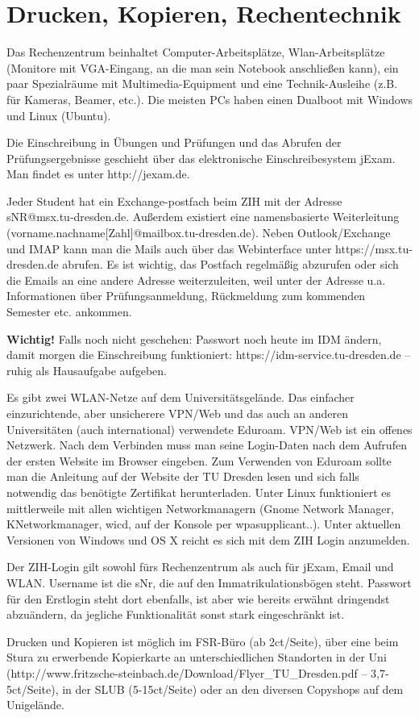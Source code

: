\documentclass[a4paper,12pt]{report}
\begin{document}
\section{Drucken, Kopieren, Rechentechnik}
\begin{itemize*}
	\item Das Rechenzentrum beinhaltet Computer-Arbeitsplätze, Wlan-Arbeitsplätze (Monitore mit VGA-Eingang, an die man sein Notebook anschließen kann), ein paar Spezialräume mit Multimedia-Equipment und eine Technik-Ausleihe (z.B. für Kameras, Beamer, etc.).
	Die meisten PCs haben einen Dualboot mit Windows und Linux (Ubuntu).
	\item Die Einschreibung in Übungen und Prüfungen und das Abrufen der Prüfungsergebnisse geschieht über das elektronische Einschreibesystem jExam.
	Man findet es unter http://jexam.de.
	\item Jeder Student hat ein Exchange-postfach beim ZIH mit der Adresse sNR@msx.tu-dresden.de. Außerdem existiert eine namensbasierte Weiterleitung (vorname.nachname[Zahl]@mailbox.tu-dresden.de).
	Neben Outlook/Exchange und IMAP kann man die Mails auch über das Webinterface unter https://msx.tu-dresden.de abrufen.
	Es ist wichtig, das Postfach regelmäßig abzurufen oder sich die Emails an eine andere Adresse weiterzuleiten, weil unter der Adresse u.a. Informationen über Prüfungsanmeldung, Rückmeldung zum kommenden Semester etc. ankommen.
	\item \textbf{Wichtig!} Falls noch nicht geschehen: Passwort noch heute im IDM ändern, damit morgen die Einschreibung funktioniert: https://idm-service.tu-dresden.de -- ruhig als Hausaufgabe aufgeben.
	\item Es gibt zwei WLAN-Netze auf dem Universitätsgelände.
	Das einfacher einzurichtende, aber unsicherere VPN/Web und das auch an anderen Universitäten (auch international) verwendete Eduroam.
	VPN/Web ist ein offenes Netzwerk.
	Nach dem Verbinden muss man seine Login-Daten nach dem Aufrufen der ersten Website im Browser eingeben.
	Zum Verwenden von Eduroam sollte man die Anleitung auf der Website der TU Dresden lesen und sich falls notwendig das benötigte Zertifikat herunterladen.
	Unter Linux funktioniert es mittlerweile mit allen wichtigen Networkmanagern (Gnome Network Manager, KNetworkmanager, wicd, auf der Konsole per wpasupplicant..).
	Unter aktuellen Versionen von Windows und OS X reicht es sich mit dem ZIH Login anzumelden.
	\item Der ZIH-Login gilt sowohl fürs Rechenzentrum als auch für jExam, Email und WLAN.
	Username ist die \glqq sNr\grqq, die auf den Immatrikulationsbögen steht.
	Passwort für den Erstlogin steht dort ebenfalls, ist aber wie bereits erwähnt dringendst abzuändern, da jegliche Funktionalität sonst stark eingeschränkt ist.
	\item Drucken und Kopieren ist möglich im FSR-Büro (ab 2ct/Seite), über eine beim Stura zu erwerbende Kopierkarte an unterschiedlichen Standorten in der Uni (http://www.fritzsche-steinbach.de/Download/Flyer\_TU\_Dresden.pdf -- 3,7-5ct/Seite), in der SLUB (5-15ct/Seite) oder an den diversen Copyshops auf dem Unigelände.
\end{itemize*}
\end{document}
